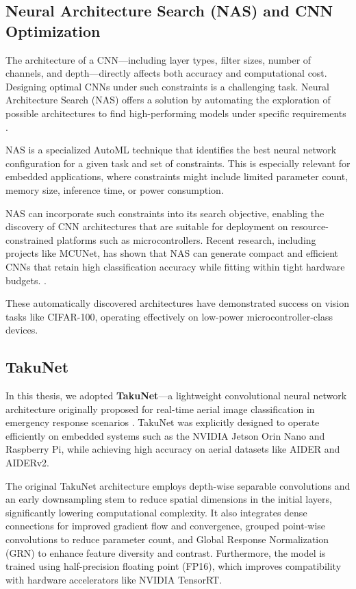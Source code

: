 \subsection{Neural Architecture Search (NAS) and CNN Optimization}

The architecture of a CNN---including layer types, filter sizes, number of channels, and depth---directly affects both accuracy and computational cost. Designing optimal CNNs under such constraints is a challenging task. Neural Architecture Search (NAS) offers a solution by automating the exploration of possible architectures to find high-performing models under specific requirements \cite{pau2023quantitative}.

NAS is a specialized AutoML technique that identifies the best neural network configuration for a given task and set of constraints. This is especially relevant for embedded applications, where constraints might include limited parameter count, memory size, inference time, or power consumption.

NAS can incorporate such constraints into its search objective, enabling the discovery of CNN architectures that are suitable for deployment on resource-constrained platforms such as microcontrollers. Recent research, including projects like MCUNet, has shown that NAS can generate compact and efficient CNNs that retain high classification accuracy while fitting within tight hardware budgets. \cite{pau2023quantitative}.

These automatically discovered architectures have demonstrated success on vision tasks like CIFAR-100, operating effectively on low-power microcontroller-class devices.

\subsection{TakuNet}

In this thesis, we adopted \textbf{TakuNet}—a lightweight convolutional neural network architecture originally proposed for real-time aerial image classification in emergency response scenarios \cite{TakuNet}. TakuNet was explicitly designed to operate efficiently on embedded systems such as the NVIDIA Jetson Orin Nano and Raspberry Pi, while achieving high accuracy on aerial datasets like AIDER and AIDERv2.

The original TakuNet architecture employs depth-wise separable convolutions and an early downsampling stem to reduce spatial dimensions in the initial layers, significantly lowering computational complexity. It also integrates dense connections for improved gradient flow and convergence, grouped point-wise convolutions to reduce parameter count, and Global Response Normalization (GRN) to enhance feature diversity and contrast. Furthermore, the model is trained using half-precision floating point (FP16), which improves compatibility with hardware accelerators like NVIDIA TensorRT.

